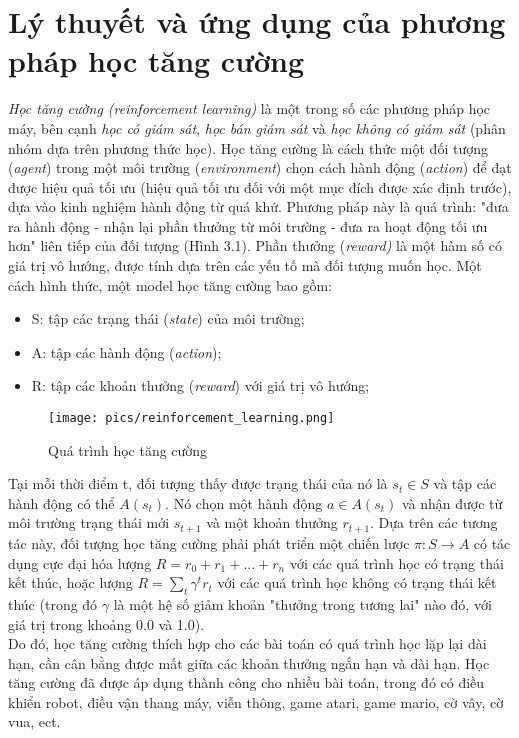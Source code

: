 \documentclass[12pt]{report}
\begin{document}
\section{Lý thuyết và ứng dụng của phương pháp học tăng cường}
\label{sec:3.1}
\textit{Học tăng cường (reinforcement learning)} là một trong số các phương pháp học máy, bên cạnh \textit{học có giám sát}, \textit{học bán giám sát} và \textit{học không có giám sát} (phân nhóm dựa trên phương thức học). Học tăng cường là cách thức một đối tượng (\textit{agent}) trong một môi trường (\textit{environment}) chọn cách hành động (\textit{action}) để đạt được hiệu quả tối ưu (hiệu quả tối ưu đối với một mục đích được xác định trước), dựa vào kinh nghiệm hành động từ quá khứ. Phương pháp này là quá trình: "đưa ra hành động - nhận lại phần thưởng từ môi trường - đưa ra hoạt động tối ưu hơn" liên tiếp của đối tượng (Hình 3.1). Phần thưởng (\textit{reward)} là một hàm số có giá trị vô hướng, được tính dựa trên các yếu tố mà đối tượng muốn học. Một cách hình thức, một model học tăng cường bao gồm:
\begin{itemize}
\item S: tập các trạng thái (\textit{state}) của môi trường;
\item A: tập các hành động (\textit{action});
\item R: tập các khoản thưởng (\textit{reward}) với giá trị vô hướng;
\end{itemize}
\begin{figure}[H]
\centering 
\texttt{[image: pics/reinforcement\_learning.png]}
\caption{Quá trình học tăng cường}
\end{figure}
Tại mỗi thời điểm t, đối tượng thấy được trạng thái của nó là $s_{t} \in S$ và tập các hành động có thể $A(s_{t})$. Nó chọn một hành động $a \in A(s_{t})$ và nhận được từ môi trường trạng thái mới $s_{t+1}$ và một khoản thưởng $r_{t+1}$. Dựa trên các tương tác này, đối tượng học tăng cường phải phát triển một chiến lược $\pi : S \rightarrow A$ có tác dụng cực đại hóa lượng $R = r_{0} + r_{1} + ... + r_{n}$ với các quá trình học có trạng thái kết thúc, hoặc lượng $R = \sum_{t}\gamma^{t}r_{t}$ với các quá trình học không có trạng thái kết thúc (trong đó $\gamma$ là một hệ số giảm khoản "thưởng trong tương lai" nào đó, với giá trị trong khoảng 0.0 và 1.0).\\
Do đó, học tăng cường thích hợp cho các bài toán có quá trình học lặp lại dài hạn, cần cân bằng được mất giữa các khoản thưởng ngắn hạn và dài hạn. Học tăng cường đã được áp dụng thành công cho nhiều bài toán, trong đó có điều khiển robot, điều vận thang máy, viễn thông, game atari, game mario, cờ vây, cờ vua, ect.
\end{document}
